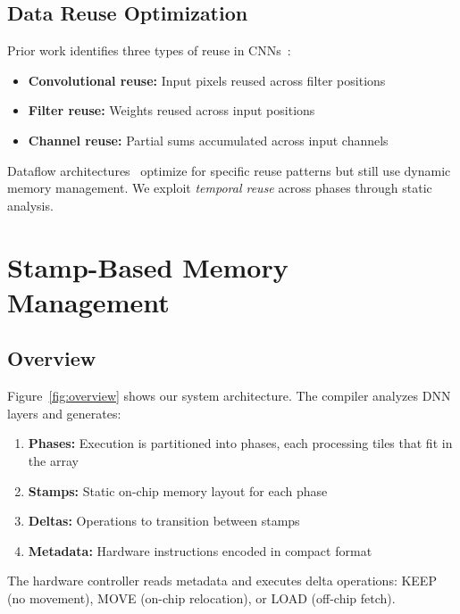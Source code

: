 \documentclass[conference]{IEEEtran}
\begin{document}
\subsection{Data Reuse Optimization}

Prior work identifies three types of reuse in CNNs~\cite{chen2016eyeriss}:
\begin{itemize}
\item \textbf{Convolutional reuse:} Input pixels reused across filter positions
\item \textbf{Filter reuse:} Weights reused across input positions
\item \textbf{Channel reuse:} Partial sums accumulated across input channels
\end{itemize}

Dataflow architectures~\cite{chen2016eyeriss, yang2020interstellar} optimize for specific reuse patterns but still use dynamic memory management. We exploit \textit{temporal reuse} across phases through static analysis.

\section{Stamp-Based Memory Management}

\subsection{Overview}

Figure~\ref{fig:overview} shows our system architecture. The compiler analyzes DNN layers and generates:

\begin{enumerate}
\item \textbf{Phases:} Execution is partitioned into phases, each processing tiles that fit in the array
\item \textbf{Stamps:} Static on-chip memory layout for each phase
\item \textbf{Deltas:} Operations to transition between stamps
\item \textbf{Metadata:} Hardware instructions encoded in compact format
\end{enumerate}

The hardware controller reads metadata and executes delta operations: KEEP (no movement), MOVE (on-chip relocation), or LOAD (off-chip fetch).
\end{document}
